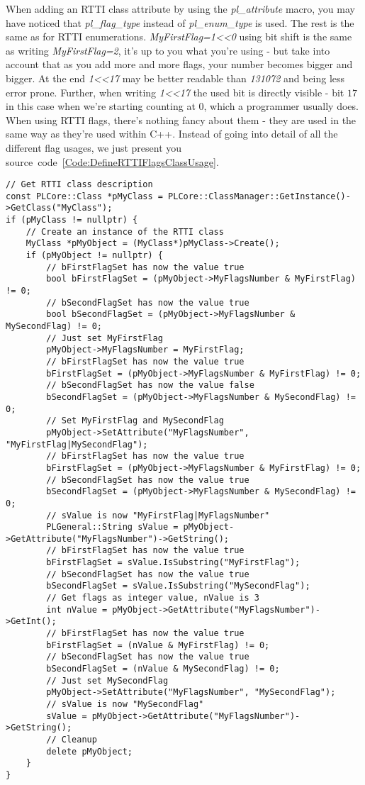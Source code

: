 When adding an RTTI class attribute by using the \emph{pl\_attribute} macro, you may have noticed that \emph{pl\_flag\_type} instead of \emph{pl\_enum\_type} is used. The rest is the same as for RTTI enumerations. \emph{MyFirstFlag=1<<0} using bit shift is the same as writing \emph{MyFirstFlag=2}, it's up to you what you're using - but take into account that as you add more and more flags, your number becomes bigger and bigger. At the end \emph{1<<17} may be better readable than \emph{131072} and being less error prone. Further, when writing \emph{1<<17} the used bit is directly visible - bit $17$ in this case when we're starting counting at $0$, which a programmer usually does. When using RTTI flags, there's nothing fancy about them - they are used in the same way as they're used within C++. Instead of going into detail of all the different flag usages, we just present you source~code~\ref{Code:DefineRTTIFlagsClassUsage}.
\begin{lstlisting}[label=Code:DefineRTTIFlagsClassUsage,caption={Using a RTTI class with an flag attribute}]
// Get RTTI class description
const PLCore::Class *pMyClass = PLCore::ClassManager::GetInstance()->GetClass("MyClass");
if (pMyClass != nullptr) {
	// Create an instance of the RTTI class
	MyClass *pMyObject = (MyClass*)pMyClass->Create();
	if (pMyObject != nullptr) {
		// bFirstFlagSet has now the value true
		bool bFirstFlagSet = (pMyObject->MyFlagsNumber & MyFirstFlag) != 0;
		// bSecondFlagSet has now the value true
		bool bSecondFlagSet = (pMyObject->MyFlagsNumber & MySecondFlag) != 0;
		// Just set MyFirstFlag
		pMyObject->MyFlagsNumber = MyFirstFlag;
		// bFirstFlagSet has now the value true
		bFirstFlagSet = (pMyObject->MyFlagsNumber & MyFirstFlag) != 0;
		// bSecondFlagSet has now the value false
		bSecondFlagSet = (pMyObject->MyFlagsNumber & MySecondFlag) != 0;
		// Set MyFirstFlag and MySecondFlag
		pMyObject->SetAttribute("MyFlagsNumber", "MyFirstFlag|MySecondFlag");
		// bFirstFlagSet has now the value true
		bFirstFlagSet = (pMyObject->MyFlagsNumber & MyFirstFlag) != 0;
		// bSecondFlagSet has now the value true
		bSecondFlagSet = (pMyObject->MyFlagsNumber & MySecondFlag) != 0;
		// sValue is now "MyFirstFlag|MyFlagsNumber"
		PLGeneral::String sValue = pMyObject->GetAttribute("MyFlagsNumber")->GetString();
		// bFirstFlagSet has now the value true
		bFirstFlagSet = sValue.IsSubstring("MyFirstFlag");
		// bSecondFlagSet has now the value true
		bSecondFlagSet = sValue.IsSubstring("MySecondFlag");
		// Get flags as integer value, nValue is 3
		int nValue = pMyObject->GetAttribute("MyFlagsNumber")->GetInt();
		// bFirstFlagSet has now the value true
		bFirstFlagSet = (nValue & MyFirstFlag) != 0;
		// bSecondFlagSet has now the value true
		bSecondFlagSet = (nValue & MySecondFlag) != 0;
		// Just set MySecondFlag
		pMyObject->SetAttribute("MyFlagsNumber", "MySecondFlag");
		// sValue is now "MySecondFlag"
		sValue = pMyObject->GetAttribute("MyFlagsNumber")->GetString();
		// Cleanup
		delete pMyObject;
	}
}
\end{lstlisting}



